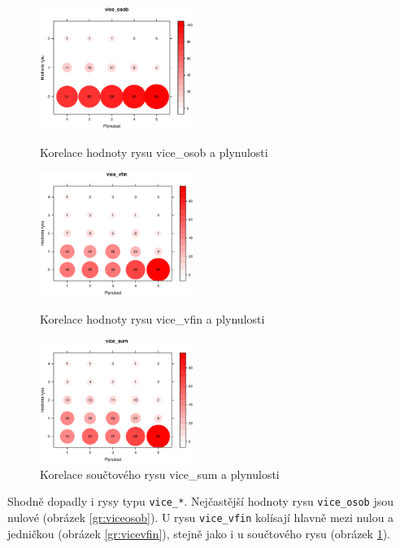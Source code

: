 \documentclass[12pt,a4paper]{report}
\begin{document}
\begin{figure}[!htb]
  \centering\includegraphics[width=50mm]{./grafy/rysy/vice_osob-c.eps}
  \caption{Korelace hodnoty rysu vice\_osob a plynulosti}\label{gr:viceosob}
\endminipage\hfill
{}
  \centering\includegraphics[width=50mm]{./grafy/rysy/vice_vfin-c.eps}
  \caption{Korelace hodnoty rysu vice\_vfin a plynulosti}\label{gr:vicevfin}
\endminipage\hfill
{}
  \centering\includegraphics[width=50mm]{./grafy/rysy/vice_sum-c.eps}
  \caption{Korelace součtového rysu vice\_sum a plynulosti}\label{gr:vicesum}
\endminipage\hfill
\end{figure}

Shodně dopadly i rysy typu \texttt{vice\_*}. Nejčastější hodnoty rysu \texttt{vice\_osob} jsou nulové (obrázek \ref{gr:viceosob}). U rysu \texttt{vice\_vfin} kolísají hlavně mezi nulou a jedničkou (obrázek \ref{gr:vicevfin}), stejně jako i u součtového rysu (obrázek \ref{gr:vicesum}).
\end{document}
